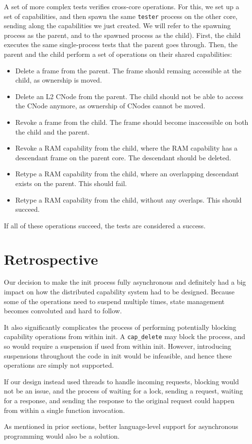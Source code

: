 A set of more complex tests verifies cross-core operations. For this, we set up a set of capabilities, and then spawn the same \texttt{tester} process on the other core, sending along the capabilities we just created. We will refer to the spawning process as the parent, and to the spawned process as the child). First, the child executes the same single-process tests that the parent goes through. Then, the parent and the child perform a set of operations on their shared capabilities:
\begin{itemize}
    \item Delete a frame from the parent. The frame should remaing accessible at the child, as ownership is moved.
    \item Delete an L2 CNode from the parent. The child should not be able to access the CNode anymore, as ownership of CNodes cannot be moved.
    \item Revoke a frame from the child. The frame should become inaccessible on both the child and the parent.
    \item Revoke a RAM capability from the child, where the RAM capability has a descendant frame on the parent core. The descendant should be deleted.
    \item Retype a RAM capability from the child, where an overlapping descendant exists on the parent. This should fail.
    \item Retype a RAM capability from the child, without any overlaps. This should succeed.
\end{itemize}
If all of these operations succeed, the tests are considered a success.

\section{Retrospective}
Our decision to make the init process fully asynchronous and definitely had a big impact on how the distributed capability system had to be designed. Because some of the operations need to suspend multiple times, state management becomes convoluted and hard to follow. 

It also significantly complicates the process of performing potentially blocking capability operations from within init. A \texttt{cap\_delete} may block the process, and so would require a suspension if used from within init. However, introducing suspensions throughout the code in init would be infeasible, and hence these operations are simply not supported.

If our design instead used threads to handle incoming requests, blocking would not be an issue, and the process of waiting for a lock, sending a request, waiting for a response, and sending the response to the original request could happen from within a single function invocation.

As mentioned in prior sections, better language-level support for asynchronous programming would also be a solution.

